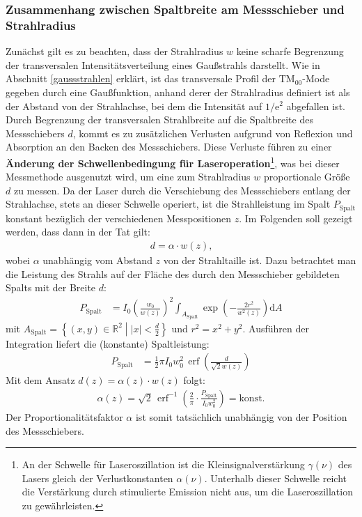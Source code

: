 \documentclass[11pt, a4paper]{article}
\numberwithin{equation}{section}
\DeclareMathOperator{\erf}{erf}
\begin{document}
\subsubsection{Zusammenhang zwischen Spaltbreite am Messschieber und Strahlradius}
\label{sssec:spaltbreite_strahlradius}
Zunächst gilt es zu beachten, dass der Strahlradius $w$ keine scharfe Begrenzung der transversalen Intensitätsverteilung eines Gaußstrahls darstellt.
Wie in Abschnitt \ref{gaussstrahlen} erklärt, ist das transversale Profil der $\mathrm{TM}_{00}$-Mode gegeben durch eine Gaußfunktion, anhand derer der Strahlradius definiert ist als der Abstand von der Strahlachse, bei dem die Intensität auf $1/\mathrm{e}^2$ abgefallen ist.
Durch Begrenzung der transversalen Strahlbreite auf die Spaltbreite des Messschiebers $d$, kommt es zu zusätzlichen Verlusten aufgrund von Reflexion und Absorption an den Backen des Messschiebers.
Diese Verluste führen zu einer \textbf{Änderung der Schwellenbedingung für Laseroperation}\footnote{An der Schwelle für Laseroszillation ist die Kleinsignalverstärkung $\gamma(\nu)$ des Lasers gleich der Verlustkonstanten $\alpha(\nu)$. Unterhalb dieser Schwelle reicht die Verstärkung durch stimulierte Emission nicht aus, um die Laseroszillation zu gewährleisten.}, was bei dieser Messmethode ausgenutzt wird, um eine zum Strahlradius $w$ proportionale Größe $d$ zu messen.
Da der Laser durch die Verschiebung des Messschiebers entlang der Strahlachse, stets an dieser Schwelle operiert, ist die Strahlleistung im Spalt $P_\mathrm{Spalt}$ konstant bezüglich der verschiedenen Messpositionen $z$.
Im Folgenden soll gezeigt werden, dass dann in der Tat gilt:
\begin{align}
	d = \alpha \cdot w(z) \text{,}
\end{align}
wobei $\alpha$ unabhängig vom Abstand $z$ von der Strahltaille ist.
Dazu betrachtet man die Leistung des Strahls auf der Fläche des durch den Messschieber gebildeten Spalts mit der Breite $d$:
\begin{align}
	P_\mathrm{Spalt} &= I_0 \left( \frac{w_0}{w(z)} \right)^2 \int_{A_\mathrm{Spalt}} \exp\left( -\frac{2 r^2}{w^2(z)} \right) \mathrm{d}A
\end{align}
mit $A_\mathrm{Spalt} = \left\{(x,y) \in \mathbb{R}^2 \middle| |x| < \frac{d}{2} \right\}$ und $r^2 = x^2 + y^2$.
Ausführen der Integration liefert die (konstante) Spaltleistung:
\begin{align}
	P_\mathrm{Spalt} &= \frac{1}{2} \pi I_0 w_0^2 \,\erf\left( \frac{d}{\sqrt{2} w(z)} \right)
\end{align}
Mit dem Ansatz $d(z) = \alpha(z) \cdot w(z)$ folgt:
\begin{align}
	\alpha(z) = \sqrt{2} \, \erf^{-1}\left( \frac{2}{\pi} \cdot \frac{P_\mathrm{Spalt}}{I_0 w_0^2}\right) = \mathrm{konst.}
\end{align}
Der Proportionalitätsfaktor $\alpha$ ist somit tatsächlich unabhängig von der Position des Messschiebers.
\end{document}
